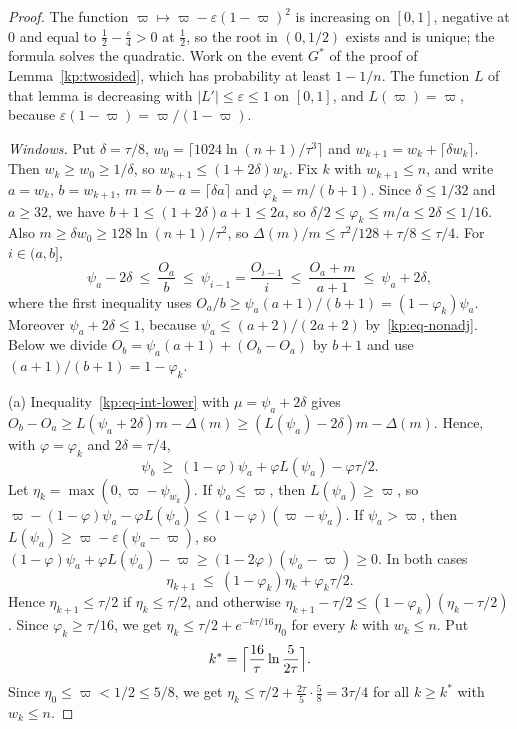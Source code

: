 \documentclass[11pt]{amsart}
\theoremstyle{definition}
\theoremstyle{remark}
\newcommand{\eps}{\varepsilon}
\begin{document}
\begin{proof}
The function $\varpi\mapsto\varpi-\eps(1-\varpi)^2$ is increasing on $[0,1]$,
negative at $0$ and equal to $\frac12-\frac\eps4>0$ at $\frac12$, so the root
in $(0,1/2)$ exists and is unique; the formula solves the quadratic. Work on
the event $G^*$ of the proof of Lemma~\ref{kp:twosided}, which has probability
at least $1-1/n$. The function $L$ of that lemma is decreasing with
$|L'|\le\eps\le 1$ on $[0,1]$, and $L(\varpi)=\varpi$, because
$\eps(1-\varpi)=\varpi/(1-\varpi)$.

\emph{Windows.} Put $\delta=\tau/8$, $w_0=\lceil 1024\ln(n+1)/\tau^3\rceil$ and
$w_{k+1}=w_k+\lceil\delta w_k\rceil$. Then $w_k\ge w_0\ge 1/\delta$, so
$w_{k+1}\le(1+2\delta)w_k$. Fix $k$ with $w_{k+1}\le n$, and write $a=w_k$,
$b=w_{k+1}$, $m=b-a=\lceil\delta a\rceil$ and $\varphi_k=m/(b+1)$. Since
$\delta\le 1/32$ and $a\ge 32$, we have $b+1\le(1+2\delta)a+1\le 2a$, so
$\delta/2\le\varphi_k\le m/a\le 2\delta\le 1/16$. Also
$m\ge\delta w_0\ge 128\ln(n+1)/\tau^2$, so
$\Delta(m)/m\le\tau^2/128+\tau/8\le\tau/4$. For $i\in(a,b]$,
\[
  \psi_a-2\delta\ \le\ \frac{O_a}{b}\ \le\ \psi_{i-1}=\frac{O_{i-1}}{i}
  \ \le\ \frac{O_a+m}{a+1}\ \le\ \psi_a+2\delta,
\]
where the first inequality uses $O_a/b\ge\psi_a(a+1)/(b+1)=(1-\varphi_k)\psi_a$.
Moreover $\psi_a+2\delta\le 1$, because $\psi_a\le(a+2)/(2a+2)$
by~\eqref{kp:eq-nonadj}. Below we divide $O_b=\psi_a(a+1)+(O_b-O_a)$ by $b+1$
and use $(a+1)/(b+1)=1-\varphi_k$.

(a) Inequality~\eqref{kp:eq-int-lower} with $\mu=\psi_a+2\delta$ gives
$O_b-O_a\ge L(\psi_a+2\delta)m-\Delta(m)\ge(L(\psi_a)-2\delta)m-\Delta(m)$.
Hence, with $\varphi=\varphi_k$ and $2\delta=\tau/4$,
\[
  \psi_b\ \ge\ (1-\varphi)\psi_a+\varphi L(\psi_a)-\varphi\tau/2 .
\]
Let $\eta_k=\max(0,\varpi-\psi_{w_k})$. If $\psi_a\le\varpi$, then
$L(\psi_a)\ge\varpi$, so
$\varpi-(1-\varphi)\psi_a-\varphi L(\psi_a)\le(1-\varphi)(\varpi-\psi_a)$. If
$\psi_a>\varpi$, then $L(\psi_a)\ge\varpi-\eps(\psi_a-\varpi)$, so
$(1-\varphi)\psi_a+\varphi L(\psi_a)-\varpi\ge(1-2\varphi)(\psi_a-\varpi)\ge0$.
In both cases
\begin{equation}\label{kp:eq-contract}
  \eta_{k+1}\ \le\ (1-\varphi_k)\eta_k+\varphi_k\tau/2 .
\end{equation}
Hence $\eta_{k+1}\le\tau/2$ if $\eta_k\le\tau/2$, and otherwise
$\eta_{k+1}-\tau/2\le(1-\varphi_k)(\eta_k-\tau/2)$. Since $\varphi_k\ge\tau/16$,
we get $\eta_k\le\tau/2+e^{-k\tau/16}\eta_0$ for every $k$ with $w_k\le n$. Put
\[
  k^*=\Bigl\lceil\frac{16}{\tau}\ln\frac{5}{2\tau}\Bigr\rceil .
\]
Since $\eta_0\le\varpi<1/2\le 5/8$, we get
$\eta_k\le\tau/2+\frac{2\tau}{5}\cdot\frac58=3\tau/4$ for all $k\ge k^*$ with
$w_k\le n$.


\end{proof}
\end{document}
